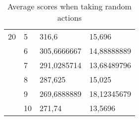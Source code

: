 \begin{table}[]
\begin{tabular}{ll|ll}
20              & 5               & 316,6                    & 15,696                       \\
                & 6               & 305,6666667              & 14,88888889                  \\
                & 7               & 291,0285714              & 13,68489796                  \\
                & 8               & 287,625                  & 15,025                       \\
                & 9               & 269,6888889              & 18,12345679                  \\
                & 10              & 271,74                   & 13,5696                     
\end{tabular}
\caption{Average scores when taking random actions}
\label{tab:random-action-table}
\end{table}